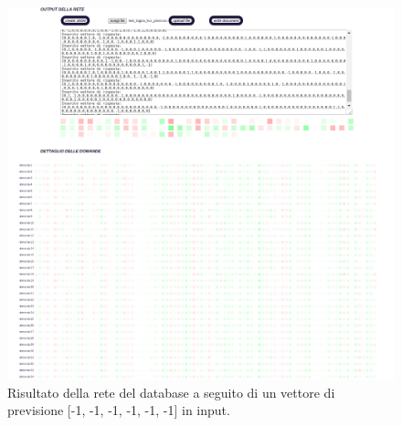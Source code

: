 \begin{itemize}
\begin{figure}[H]
\centering
	\includegraphics[width=0.90\linewidth]{./image/rete_db-vpmeno1.png}
	\caption{Risultato della rete del database a seguito di un vettore di previsione [-1, -1, -1, -1, -1, -1] in input.}
\end{figure}


\end{itemize}
